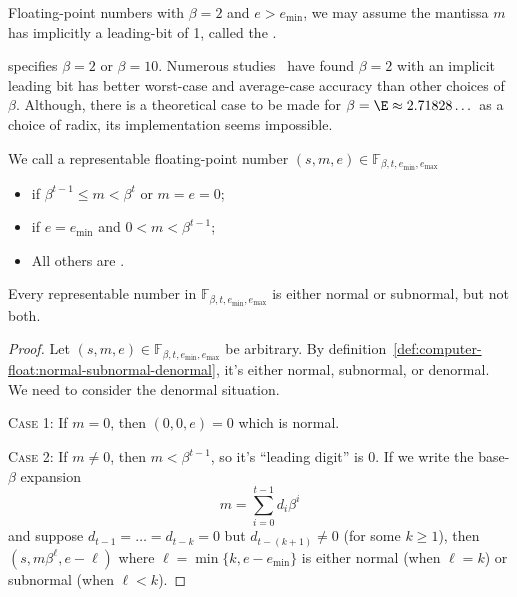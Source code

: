 \begin{defn}
  Floating-point numbers with $\beta=2$ and $e>e_{\text{min}}$, we may
  assume the mantissa $m$ has implicitly a leading-bit of 1,
  called the .
\end{defn}
\begin{rmk}
   specifies $\beta=2$ or $\beta=10$. Numerous studies~\cite{DBLP:journals/corr/abs-1004-3374,10.1145/363235.363240,5009112,10.1145/362003.362013,4039164}
have found $\beta=2$ with an implicit leading bit has better worst-case
and average-case accuracy than other choices of $\beta$. Although, there
is a theoretical case to be made for $\beta=\E\approx2.71828\dots$ as a
choice of radix, its implementation seems impossible.
\end{rmk}
\begin{defn}\label{def:computer-float:normal-subnormal-denormal}
We call a representable floating-point number $(s,m,e)\in\mathbb{F}_{\beta,t,e_{\text{min}},e_{\text{max}}}$
\begin{itemize}
\item{} if $\beta^{t-1}\leq m<\beta^{t}$ or $m=e=0$;
\item{} if $e=e_{\text{min}}$ and $0<m<\beta^{t-1}$;
\item All others are .
\end{itemize}
\end{defn}
\begin{thm}
  Every representable number in $\mathbb{F}_{\beta,t,e_{\text{min}},e_{\text{max}}}$
  is either normal or subnormal, but not both.
\end{thm}
\begin{proof}
  Let  $(s,m,e)\in\mathbb{F}_{\beta,t,e_{\text{min}},e_{\text{max}}}$ be
  arbitrary. By
  definition~\ref{def:computer-float:normal-subnormal-denormal},
  it's either normal, subnormal, or denormal. We need to consider the
  denormal situation.

  \textsc{Case 1:} If $m=0$, then $(0,0,e)=0$ which is normal.

  \textsc{Case 2:} If $m\neq0$, then $m<\beta^{t-1}$, so it's ``leading
  digit'' is 0. If we write the base-$\beta$ expansion
  \begin{equation}
    m=\sum^{t-1}_{i=0}d_{i}\beta^{i}
  \end{equation}
  and suppose $d_{t-1}=\dots=d_{t-k}=0$ but $d_{t-(k+1)}\neq0$ (for some
  $k\geq1$), then $(s,m\beta^{\ell},e-\ell)$ where $\ell=\min\{k,e-e_{\text{min}}\}$
  is either normal (when $\ell=k$) or subnormal (when $\ell<k$).
\end{proof}

